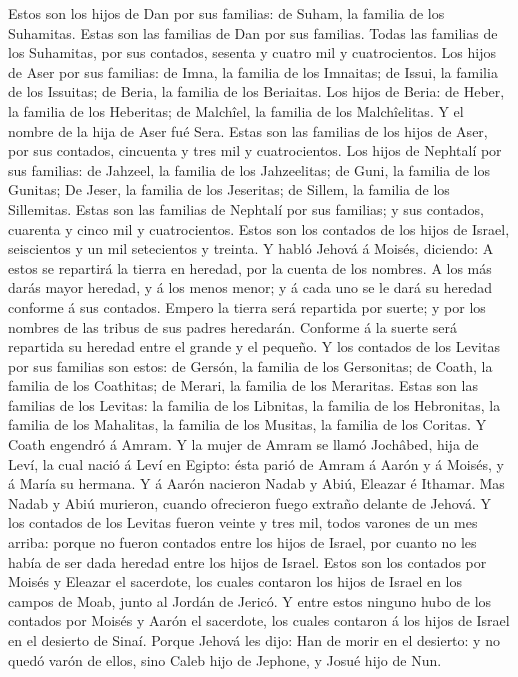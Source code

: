  Estos son los hijos de Dan por sus familias: de Suham, la
familia de los Suhamitas. Estas son las familias de Dan por sus
familias.  Todas las familias de los Suhamitas, por sus
contados, sesenta y cuatro mil y cuatrocientos.  Los hijos
de Aser por sus familias: de Imna, la familia de los Imnaitas; de Issui,
la familia de los Issuitas; de Beria, la familia de los Beriaitas.
 Los hijos de Beria: de Heber, la familia de los Heberitas;
de Malchîel, la familia de los Malchîelitas.  Y el nombre
de la hija de Aser fué Sera.  Estas son las familias de los
hijos de Aser, por sus contados, cincuenta y tres mil y cuatrocientos.
 Los hijos de Nephtalí por sus familias: de Jahzeel, la
familia de los Jahzeelitas; de Guni, la familia de los Gunitas;
 De Jeser, la familia de los Jeseritas; de Sillem, la
familia de los Sillemitas.  Estas son las familias de
Nephtalí por sus familias; y sus contados, cuarenta y cinco mil y
cuatrocientos.  Estos son los contados de los hijos de
Israel, seiscientos y un mil setecientos y treinta.  Y
habló Jehová á Moisés, diciendo:  A estos se repartirá la
tierra en heredad, por la cuenta de los nombres.  A los más
darás mayor heredad, y á los menos menor; y á cada uno se le dará su
heredad conforme á sus contados.  Empero la tierra será
repartida por suerte; y por los nombres de las tribus de sus padres
heredarán.  Conforme á la suerte será repartida su heredad
entre el grande y el pequeño.  Y los contados de los
Levitas por sus familias son estos: de Gersón, la familia de los
Gersonitas; de Coath, la familia de los Coathitas; de Merari, la familia
de los Meraritas.  Estas son las familias de los Levitas:
la familia de los Libnitas, la familia de los Hebronitas, la familia de
los Mahalitas, la familia de los Musitas, la familia de los Coritas. Y
Coath engendró á Amram.  Y la mujer de Amram se llamó
Jochâbed, hija de Leví, la cual nació á Leví en Egipto: ésta parió de
Amram á Aarón y á Moisés, y á María su hermana.  Y á Aarón
nacieron Nadab y Abiú, Eleazar é Ithamar.  Mas Nadab y Abiú
murieron, cuando ofrecieron fuego extraño delante de Jehová.
 Y los contados de los Levitas fueron veinte y tres mil,
todos varones de un mes arriba: porque no fueron contados entre los
hijos de Israel, por cuanto no les había de ser dada heredad entre los
hijos de Israel.  Estos son los contados por Moisés y
Eleazar el sacerdote, los cuales contaron los hijos de Israel en los
campos de Moab, junto al Jordán de Jericó.  Y entre estos
ninguno hubo de los contados por Moisés y Aarón el sacerdote, los cuales
contaron á los hijos de Israel en el desierto de Sinaí. 
Porque Jehová les dijo: Han de morir en el desierto: y no quedó varón de
ellos, sino Caleb hijo de Jephone, y Josué hijo de Nun.

